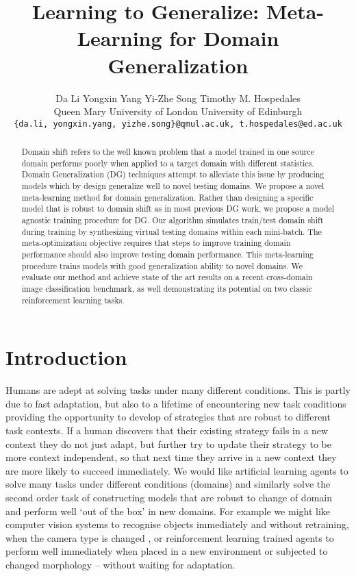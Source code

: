 \documentclass[letterpaper]{article} \usepackage{aaai18}  \usepackage{times}  \usepackage{helvet}  \usepackage{courier}  \usepackage{url}  \usepackage{graphicx}  \usepackage{amsmath}
\begin{document}
\title{Learning to Generalize: Meta-Learning for Domain Generalization}
\author{Da Li \quad Yongxin Yang \quad Yi-Zhe Song \quad Timothy M. Hospedales\\
Queen Mary University of London \quad
University of Edinburgh \\
{\tt\small \{da.li, yongxin.yang, yizhe.song\}@qmul.ac.uk, t.hospedales@ed.ac.uk}}
\maketitle
\begin{abstract}
Domain shift refers to the well known problem that a model trained in one source domain performs poorly when applied to a target domain with different statistics. {Domain Generalization} (DG) techniques attempt to alleviate this issue by producing models which by design generalize well to novel testing domains. We propose a novel {meta-learning} method for domain generalization. Rather than designing a specific model that is robust to domain shift as in most previous DG work, we propose a model agnostic training procedure for DG. Our algorithm  simulates train/test domain shift during training by synthesizing virtual testing domains within each mini-batch. The meta-optimization objective requires that steps to improve training domain performance should also improve testing domain performance.
This meta-learning procedure trains models with good generalization ability to novel domains. We evaluate our method and achieve state of the art results on a recent cross-domain image classification benchmark, as well demonstrating its potential on two classic reinforcement learning tasks. 

\end{abstract}

\section{Introduction}

Humans are adept at solving tasks under many different conditions. This is partly due to fast adaptation, but also to a lifetime of encountering new task conditions providing the opportunity to develop of strategies that are  robust to different task contexts. If a human discovers that their existing strategy fails in a new context they do not just adapt, but further try to update their strategy to be more context independent, so that next time they arrive in a new context they are more likely to succeed immediately. We would like artificial learning agents to solve many tasks under different conditions (domains) and similarly solve the second order task of constructing models that are robust to change of domain and perform well `out of the box' in new domains. For example we might like computer vision systems to recognise objects immediately and without retraining, when the camera type is changed \cite{patel2015vdaSurvey}, or reinforcement learning trained agents to perform well immediately when placed in a new environment or subjected to changed morphology \cite{taylor2009TL_RL_Survey} -- without waiting for adaptation.
\end{document}
